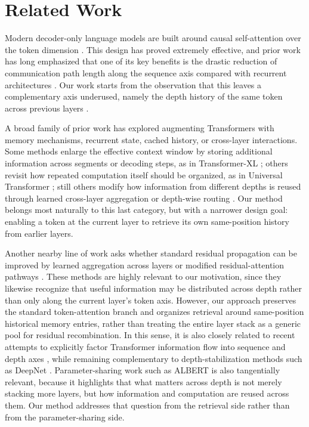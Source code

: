 \documentclass[11pt]{article}
\begin{document}
\section{Related Work}

Modern decoder-only language models are built around causal self-attention over the token dimension \cite{vaswani2017attention,radford2019gpt2}. This design has proved extremely effective, and prior work has long emphasized that one of its key benefits is the drastic reduction of communication path length along the sequence axis compared with recurrent architectures \cite{vaswani2017attention}. Our work starts from the observation that this leaves a complementary axis underused, namely the depth history of the same token across previous layers \cite{zhang2026residual}.

A broad family of prior work has explored augmenting Transformers with memory mechanisms, recurrent state, cached history, or cross-layer interactions. Some methods enlarge the effective context window by storing additional information across segments or decoding steps, as in Transformer-XL \cite{dai2019transformerxl}; others revisit how repeated computation itself should be organized, as in Universal Transformer \cite{dehghani2018universal}; still others modify how information from different depths is reused through learned cross-layer aggregation or depth-wise routing \cite{ravula2021realformer,denseformer2024,dca2025,muddformer2025,kimi2026attnres}. Our method belongs most naturally to this last category, but with a narrower design goal: enabling a token at the current layer to retrieve its own same-position history from earlier layers.

Another nearby line of work asks whether standard residual propagation can be improved by learned aggregation across layers or modified residual-attention pathways \cite{ravula2021realformer,denseformer2024,dca2025,kimi2026attnres}. These methods are highly relevant to our motivation, since they likewise recognize that useful information may be distributed across depth rather than only along the current layer's token axis. However, our approach preserves the standard token-attention branch and organizes retrieval around same-position historical memory entries, rather than treating the entire layer stack as a generic pool for residual recombination. In this sense, it is also closely related to recent attempts to explicitly factor Transformer information flow into sequence and depth axes \cite{zhang2026residual}, while remaining complementary to depth-stabilization methods such as DeepNet \cite{wang2022deepnet}. Parameter-sharing work such as ALBERT \cite{lan2019albert} is also tangentially relevant, because it highlights that what matters across depth is not merely stacking more layers, but how information and computation are reused across them. Our method addresses that question from the retrieval side rather than from the parameter-sharing side.
\end{document}
